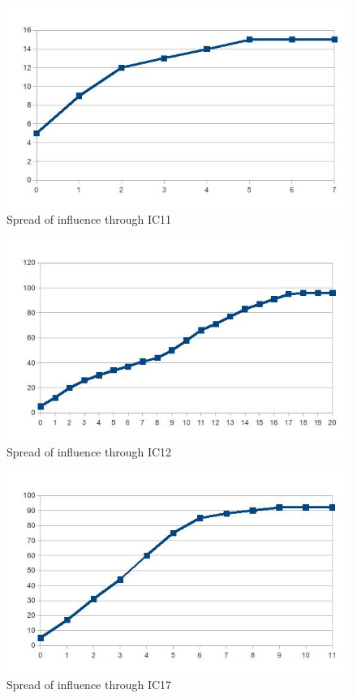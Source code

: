 \begin{figure}[htbp]%
\centering
\includegraphics[]{./img/ic11}%
\caption{Spread of influence through IC11}%
\label{fig:ic11}%
\end{figure}

\begin{figure}[htbp]%
\centering
\includegraphics[]{./img/ic12}%
\caption{Spread of influence through IC12}%
\label{fig:ic12}%
\end{figure}

\begin{figure}[htbp]%
\centering
\includegraphics[]{./img/ic17}%
\caption{Spread of influence through IC17}%
\label{fig:ic17}%
\end{figure}

